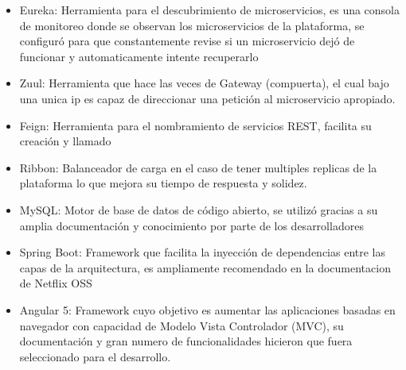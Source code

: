 \begin{itemize}
    \item Eureka: Herramienta para el descubrimiento de microservicios, es una consola de monitoreo donde se observan los microservicios de la plataforma, se configuró para que constantemente revise si un microservicio dejó de funcionar y automaticamente intente recuperarlo
    \item Zuul: Herramienta que hace las veces de Gateway (compuerta), el cual bajo una unica ip es capaz de direccionar una petición al microservicio apropiado.
    \item Feign: Herramienta para el nombramiento de servicios REST, facilita su creación y llamado
    \item Ribbon: Balanceador de carga en el caso de tener multiples replicas de la plataforma lo que mejora su tiempo de respuesta y solidez.
    \item MySQL: Motor de base de datos de código abierto, se utilizó gracias a su amplia documentación y conocimiento por parte de los desarrolladores
    \item Spring Boot: Framework que facilita la inyección de dependencias entre las capas de la arquitectura, es ampliamente recomendado en la documentacion de Netflix OSS
    \item Angular 5: Framework cuyo objetivo es aumentar las aplicaciones basadas en navegador con capacidad de Modelo Vista Controlador (MVC), su documentación y gran numero de funcionalidades hicieron que fuera seleccionado para el desarrollo.
\end{itemize}